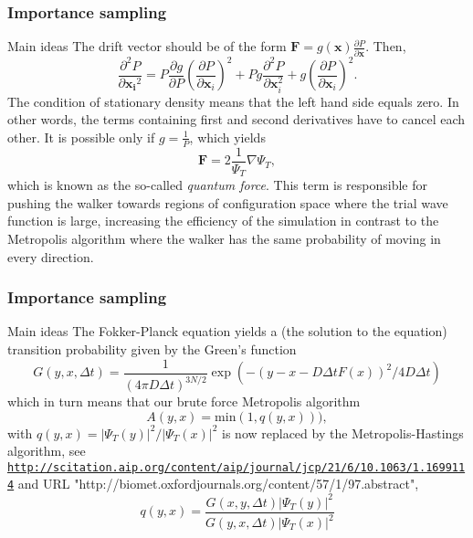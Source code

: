 \documentclass{beamer}
\begin{document}
\begin{frame}
\frametitle{Importance sampling}

\begin{block}{Main ideas }
The drift vector should be of the form $\mathbf{F} = g(\mathbf{x}) \frac{\partial P}{\partial \mathbf{x}}$. Then,
\[
\frac{\partial^2 P}{\partial {\mathbf{x_i}^2}} = P\frac{\partial g}{\partial P}\left( \frac{\partial P}{\partial {\mathbf{x}_i}}  \right)^2 + P g \frac{\partial ^2 P}{\partial {\mathbf{x}_i^2}}  + g \left( \frac{\partial P}{\partial {\mathbf{x}_i}}  \right)^2.
\]
The condition of stationary density means that the left hand side equals zero. In other words, the terms containing first and second derivatives have to cancel each other. It is possible only if $g = \frac{1}{P}$, which yields
\begin{equation}
\boxed{\mathbf{F} = 2\frac{1}{\Psi_T}\nabla\Psi_T,}
\end{equation}
\label{quantumForceEQ}
which is known as the so-called \emph{quantum force}. This term is responsible for pushing the walker towards regions of configuration space where the trial wave function is large, increasing the efficiency of the simulation in contrast to the Metropolis algorithm where the walker has the same probability of moving in every direction.
\end{block}
\end{frame}

\begin{frame}
\frametitle{Importance sampling}

\begin{block}{Main ideas }
The Fokker-Planck equation yields a (the solution to the equation) transition probability given by the Green's function
\[
  G(y,x,\Delta t) = \frac{1}{(4\pi D\Delta t)^{3N/2}} \exp{\left(-(y-x-D\Delta t F(x))^2/4D\Delta t\right)}
\]
which in turn means that our brute force Metropolis algorithm
\[ 
    A(y,x) = \mathrm{min}(1,q(y,x))),
\]
with $q(y,x) = |\Psi_T(y)|^2/|\Psi_T(x)|^2$ is now replaced by the Metropolis-Hastings algorithm, see
\href{{http://scitation.aip.org/content/aip/journal/jcp/21/6/10.1063/1.1699114}}{\nolinkurl{http://scitation.aip.org/content/aip/journal/jcp/21/6/10.1063/1.1699114}} and URL "http://biomet.oxfordjournals.org/content/57/1/97.abstract", 
\[
q(y,x) = \frac{G(x,y,\Delta t)|\Psi_T(y)|^2}{G(y,x,\Delta t)|\Psi_T(x)|^2}
\]
\end{block}
\end{frame}
\end{document}

